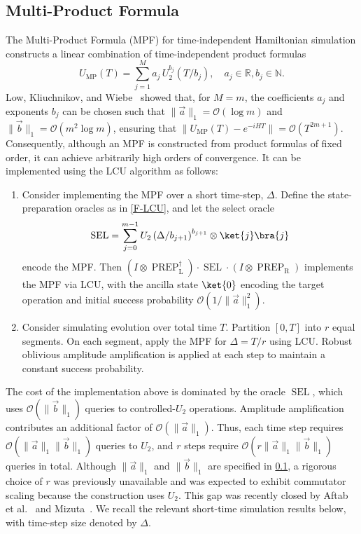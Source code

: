 \documentclass[10pt,reqno]{article}
\numberwithin{equation}{section}
\theoremstyle{plain}
\theoremstyle{definition}
\begin{document}
\subsection{Multi-Product Formula}\label{sec:mpf}
The Multi-Product Formula (MPF) for time-independent Hamiltonian simulation constructs a linear combination of time-independent product formulas
\begin{equation}\label{multiproduct}
    U_{\operatorname{MP}}(T) = \sum_{j=1}^{M} a_j \,  U^{b_j}_{2}(T/b_j),
    \quad a_j\in \mathbb{R}, b_j \in \mathbb N.
\end{equation}
Low, Kliuchnikov, and Wiebe~\cite{low2019wellconditioned} showed that, for \(M = m\), the coefficients \(a_j\) and exponents \(b_j\) can be chosen such that $\|\vec{a}\|_1 = \mathcal{O}(\log m)$ and $\|\vec{b}\|_1 = \mathcal{O}(m^2 \log m)$, ensuring that  $\|U_{\operatorname{MP}}(T) - e^{-i H T} \| = \mathcal{O}(T^{2m+1})$. Consequently, although an MPF is constructed from product formulas of fixed order, it can achieve arbitrarily high orders of convergence. It can be implemented using the LCU algorithm as follows:
\begin{enumerate}
\item Consider implementing the MPF over a short time-step, $\Delta$. Define the state-preparation oracles as in \cref{F-LCU}, and let the select oracle
\begin{equation}
\operatorname{SEL} = \sum_{j=0}^{m-1} U_2\left(\Delta/b_{j+1}\right)^{b_{j+1}} \otimes \ket{j}\bra{j} 
\end{equation}
encode the MPF. Then $(I \otimes \operatorname{PREP}^\dagger_{\operatorname{L}}) \cdot \operatorname{SEL} \cdot (I \otimes \operatorname{PREP}_{\operatorname{R}})$ implements the MPF via LCU, with the ancilla state $\ket{0}$ encoding the target operation and initial success probability $\mathcal{O}(1/\|\vec{a}\|_1^2)$.
\item Consider simulating evolution over total time $T$. Partition $[0,T]$ into $r$ equal segments. On each segment, apply the MPF for $\Delta=T/r$ using LCU. Robust oblivious amplitude amplification is applied at each step to maintain a constant success probability.
\end{enumerate}

The cost of the implementation above is dominated by the oracle \(\operatorname{SEL}\), which uses \(\mathcal{O}(\|\vec{b}\|_1)\) queries to controlled-\(U_2\) operations. Amplitude amplification contributes an additional factor of \(\mathcal{O}(\|\vec{a}\|_1)\). Thus, each time step requires \(\mathcal{O}(\|\vec{a}\|_1\|\vec{b}\|_1)\) queries to \(U_2\), and \(r\) steps require \(\mathcal{O}(r\|\vec{a}\|_1\|\vec{b}\|_1)\) queries in total. Although \(\|\vec{a}\|_1\) and \(\|\vec{b}\|_1\) are specified in \cref{sec:mpf}, a rigorous choice of \(r\) was previously unavailable and was expected to exhibit commutator scaling because the construction uses \(U_2\). This gap was recently closed by Aftab et al.~\cite{aftab2024mpf} and Mizuta~\cite{mizuta2025commutatorscalinghamiltoniansimulation}. We recall the relevant short-time simulation results below, with time-step size denoted by \(\Delta\).
\end{document}
